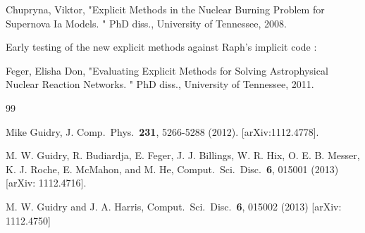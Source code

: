 \documentclass[11pt]{article}
\begin{document}
Chupryna, Viktor, "Explicit Methods in the Nuclear Burning Problem for Supernova 
Ia Models. " PhD diss., University of Tennessee, 2008.

Early testing of the new explicit methods against Raph's implicit code 
\cite{fege2011}:

Feger, Elisha Don, "Evaluating Explicit Methods for Solving Astrophysical 
Nuclear Reaction Networks. " PhD diss., University of Tennessee, 2011.


\clearpage

\setcounter{section}{0}
\appendix

\newpage


\begin{thebibliography} {99}

% 
% 
% 
% 
% 

Mike Guidry, J. Comp.\ Phys.\ {\bf 231}, 5266-5288 (2012). 
[arXiv:1112.4778].

 M. W. Guidry, R. Budiardja, E. Feger, J. J. Billings, W. R. 
Hix, O.
E. B. Messer, K. J. Roche, E. McMahon, and M. He, Comput.\ Sci.\ Disc.\ {\bf 6},
015001 (2013) [arXiv: 1112.4716].

 M. W. Guidry and J. A. Harris, Comput.\ Sci.\ Disc.\ {\bf 6},
015002 (2013) [arXiv: 1112.4750]


\end{thebibliography}
\end{document}
